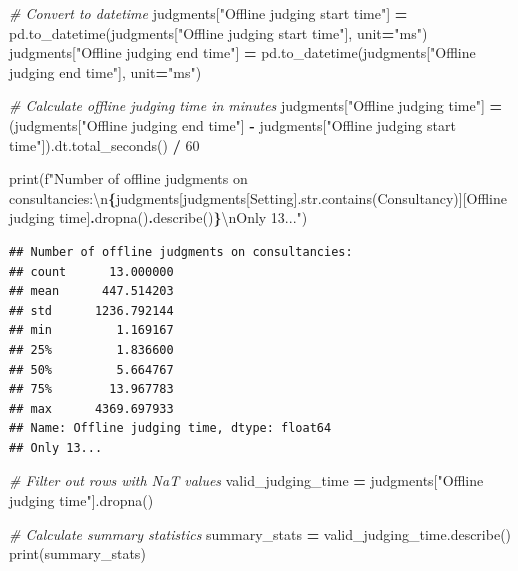 \documentclass[
]{article}
\newenvironment{Shaded}{\begin{snugshade}}{\end{snugshade}}
\newcommand{\BuiltInTok}[1]{#1}
\newcommand{\CharTok}[1]{\textcolor[rgb]{0.31,0.60,0.02}{#1}}
\newcommand{\CommentTok}[1]{\textcolor[rgb]{0.56,0.35,0.01}{\textit{#1}}}
\newcommand{\DecValTok}[1]{\textcolor[rgb]{0.00,0.00,0.81}{#1}}
\newcommand{\NormalTok}[1]{#1}
\newcommand{\OperatorTok}[1]{\textcolor[rgb]{0.81,0.36,0.00}{\textbf{#1}}}
\newcommand{\SpecialCharTok}[1]{\textcolor[rgb]{0.81,0.36,0.00}{\textbf{#1}}}
\newcommand{\SpecialStringTok}[1]{\textcolor[rgb]{0.31,0.60,0.02}{#1}}
\newcommand{\StringTok}[1]{\textcolor[rgb]{0.31,0.60,0.02}{#1}}
\begin{document}
\begin{Shaded}
\begin{Highlighting}[]
\CommentTok{\# Convert to datetime}
\NormalTok{judgments[}\StringTok{"Offline judging start time"}\NormalTok{] }\OperatorTok{=}\NormalTok{ pd.to\_datetime(judgments[}\StringTok{"Offline judging start time"}\NormalTok{], unit}\OperatorTok{=}\StringTok{"ms"}\NormalTok{)}
\NormalTok{judgments[}\StringTok{"Offline judging end time"}\NormalTok{] }\OperatorTok{=}\NormalTok{ pd.to\_datetime(judgments[}\StringTok{"Offline judging end time"}\NormalTok{], unit}\OperatorTok{=}\StringTok{"ms"}\NormalTok{)}

\CommentTok{\# Calculate offline judging time in minutes}
\NormalTok{judgments[}\StringTok{"Offline judging time"}\NormalTok{] }\OperatorTok{=}\NormalTok{ (judgments[}\StringTok{"Offline judging end time"}\NormalTok{] }\OperatorTok{{-}}\NormalTok{ judgments[}\StringTok{"Offline judging start time"}\NormalTok{]).dt.total\_seconds() }\OperatorTok{/} \DecValTok{60}


\BuiltInTok{print}\NormalTok{(}\SpecialStringTok{f"Number of offline judgments on consultancies:}\CharTok{\textbackslash{}n}\SpecialCharTok{\{}\NormalTok{judgments[judgments[}\StringTok{\textquotesingle{}Setting\textquotesingle{}}\NormalTok{].}\BuiltInTok{str}\NormalTok{.contains(}\StringTok{\textquotesingle{}Consultancy\textquotesingle{}}\NormalTok{)][}\StringTok{\textquotesingle{}Offline judging time\textquotesingle{}}\NormalTok{]}\SpecialCharTok{.}\NormalTok{dropna()}\SpecialCharTok{.}\NormalTok{describe()}\SpecialCharTok{\}}\CharTok{\textbackslash{}n}\SpecialStringTok{Only 13..."}\NormalTok{)}
\end{Highlighting}
\end{Shaded}

\begin{verbatim}
## Number of offline judgments on consultancies:
## count      13.000000
## mean      447.514203
## std      1236.792144
## min         1.169167
## 25%         1.836600
## 50%         5.664767
## 75%        13.967783
## max      4369.697933
## Name: Offline judging time, dtype: float64
## Only 13...
\end{verbatim}

\begin{Shaded}
\begin{Highlighting}[]
\CommentTok{\# Filter out rows with NaT values}
\NormalTok{valid\_judging\_time }\OperatorTok{=}\NormalTok{ judgments[}\StringTok{"Offline judging time"}\NormalTok{].dropna()}

\CommentTok{\# Calculate summary statistics}
\NormalTok{summary\_stats }\OperatorTok{=}\NormalTok{ valid\_judging\_time.describe()}
\BuiltInTok{print}\NormalTok{(summary\_stats)}
\end{Highlighting}
\end{Shaded}
\end{document}
